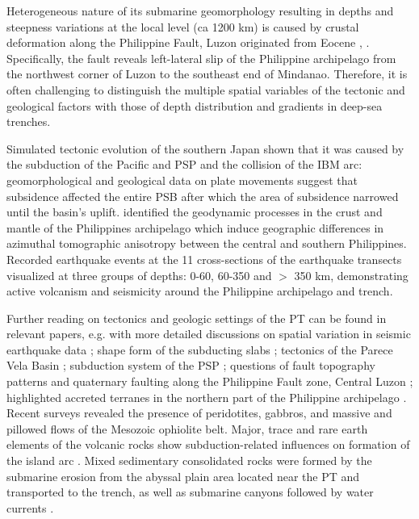 \documentclass[11pt,a4paper]{report}
\begin{document}
Heterogeneous nature of its submarine geomorphology resulting in depths and steepness variations at the local level (ca 1200 km) is caused by crustal deformation along the Philippine Fault, Luzon originated from Eocene \cite{Yuetal2013}, \cite{Suzukietal2017}. Specifically, the fault reveals left-lateral slip of the Philippine archipelago from the northwest corner of Luzon to the southeast end of Mindanao.  Therefore, it is often challenging to distinguish the multiple spatial variables of the tectonic and geological factors with those of depth distribution and gradients in deep-sea trenches.

Simulated tectonic evolution of the southern Japan \cite{Hashimaetal2016} shown that it was caused by the subduction of the Pacific and \ac{PSP} and the collision of the \ac{IBM} arc: geomorphological and geological data on plate movements suggest that subsidence affected the entire \ac{PSB} after which the area of subsidence narrowed until the basin's uplift. \cite{FanZhao2019} identified the geodynamic processes in the crust and mantle of the Philippines archipelago which induce geographic differences in azimuthal tomographic anisotropy between the central and southern Philippines. Recorded earthquake events at the 11 cross-sections of the earthquake transects visualized at three groups of depths: 0-60, 60-350 and $>$ 350 km, demonstrating active volcanism and seismicity around the Philippine archipelago and trench.

Further reading on tectonics and geologic settings of the \ac{PT} can be found in relevant papers, e.g. with more detailed discussions on spatial variation in seismic earthquake data \cite{Besanaetal1997}; shape form of the subducting slabs \cite{Bautista}; tectonics of the Parece Vela Basin \cite{Okinoetal2009}; subduction system of the \ac{PSP} \cite{Holtetal2018}; questions of fault topography patterns and quaternary faulting along the Philippine Fault zone, Central Luzon \cite{Hiranoetal1986}; highlighted accreted terranes in the northern part of the Philippine archipelago \cite{Karig1983}. Recent surveys revealed the presence of peridotites, gabbros, and massive and pillowed flows of the Mesozoic ophiolite belt. Major, trace and rare earth elements of the volcanic rocks show subduction-related influences on formation of the island arc \cite{Guotanaetal2017}. Mixed sedimentary consolidated rocks were formed by the submarine erosion from the abyssal plain area located near the \ac{PT} and transported to the trench, as well as submarine canyons followed by water currents \cite{Lemenkova201990}. 
\end{document}

